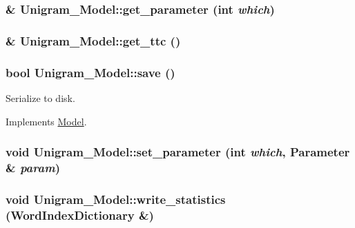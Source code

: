 \hypertarget{class_unigram___model_a4019fec4ad9201ff501e9649c7d56dac}{
\subsubsection[{get\_\-parameter}]{ \& Unigram\_\-Model::get\_\-parameter (int {\em which})}}
\label{class_unigram___model_a4019fec4ad9201ff501e9649c7d56dac}
\hypertarget{class_unigram___model_ad658c21f80aed90d7a06bcc627a23032}{
\subsubsection[{get\_\-ttc}]{ \& Unigram\_\-Model::get\_\-ttc ()}}
\label{class_unigram___model_ad658c21f80aed90d7a06bcc627a23032}
\hypertarget{class_unigram___model_a8ca0b95bc57583f70035825f1f950314}{
\subsubsection[{save}]{\setlength{\rightskip}{0pt plus 5cm}bool Unigram\_\-Model::save ()}}
\label{class_unigram___model_a8ca0b95bc57583f70035825f1f950314}


Serialize to disk. 



Implements \hyperlink{class_model_a9eb67634d1cbfbbe5758571e230834d4}{Model}.

\hypertarget{class_unigram___model_a6c75eb8c6c27305b9d37f2425c471c34}{
\subsubsection[{set\_\-parameter}]{\setlength{\rightskip}{0pt plus 5cm}void Unigram\_\-Model::set\_\-parameter (int {\em which}, \/  {\bf Parameter} \& {\em param})}}
\label{class_unigram___model_a6c75eb8c6c27305b9d37f2425c471c34}
\hypertarget{class_unigram___model_a15ce4009b3434ea11a5045f8f20ce294}{
\subsubsection[{write\_\-statistics}]{\setlength{\rightskip}{0pt plus 5cm}void Unigram\_\-Model::write\_\-statistics ({\bf WordIndexDictionary} \&)}}
\label{class_unigram___model_a15ce4009b3434ea11a5045f8f20ce294}


